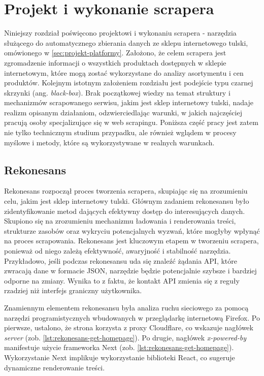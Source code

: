 \newpage


\section{Projekt i wykonanie scrapera}\label{sec:projekt-scrapera}

Niniejszy rozdział poświęcono projektowi i wykonaniu scrapera - narzędzia służącego do automatycznego zbierania danych ze sklepu internetowego tulski, omówionego w \autoref{sec:projekt-platformy}.
Założono, że celem scrapera jest zgromadzenie informacji o wszystkich produktach dostępnych w sklepie internetowym, które mogą zostać wykorzystane do analizy asortymentu i cen produktów.
Kolejnym istotnym założeniem rozdziału jest podejście typu czarnej skrzynki (ang. \emph{black-box})\cite{sekurak-testy-penetracyjne}.
Brak początkowej wiedzy na temat struktury i mechanizmów scrapowanego serwisu, jakim jest sklep internetowy tulski, nadaje realizm opisanym działaniom, odzwierciedlając warunki, w jakich najczęściej pracują osoby specjalizujące się w web scrapingu.
Poniższa część pracy jest zatem nie tylko technicznym studium przypadku, ale również wglądem w procesy myślowe i metody, które są wykorzystywane w realnych warunkach.

\subsection{Rekonesans}\label{subsec:rekonesans}

Rekonesans rozpoczął proces tworzenia scrapera, skupiając się na zrozumieniu celu, jakim jest sklep internetowy tulski.
Głównym zadaniem rekonesansu było zidentyfikowanie metod dających efektywny dostęp do interesujących danych.
Skupiono się na zrozumieniu mechanizmu ładowania i renderowania treści, strukturze zasobów oraz wykryciu potencjalnych wyzwań, które mogłyby wpłynąć na proces scrapowania.
Rekonesans jest kluczowym etapem w tworzeniu scrapera, ponieważ od niego zależą efektywność, awaryjność i stabilność narzędzia.
Przykładowo, jeśli podczas rekonesansu uda się znaleźć żądania API, które zwracają dane w formacie JSON, narzędzie będzie potencjalnie szybsze i bardziej odporne na zmiany.
Wynika to z faktu, że kontakt API zmienia się z reguły rzadziej niż interfejs graniczny użytkownika.

Znamiennym elementem rekonesansu była analiza ruchu sieciowego za pomocą narzędzi programistycznych wbudowanych w przeglądarkę internetową Firefox.
Po pierwsze, ustalono, że strona korzysta z proxy Cloudflare, co wskazuje nagłówek \emph{server} (zob. \autoref{lst:rekonesans-get-homepage}).
Po drugie, nagłówek \emph{x-powered-by} manifestuje użycie frameworka Next (zob. \autoref{lst:rekonesans-get-homepage}).
Wykorzystanie Next implikuje wykorzystanie biblioteki React, co sugeruje dynamiczne renderowanie treści.

